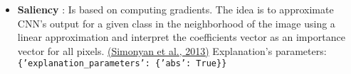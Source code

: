 \documentclass{article}%
\begin{document}
\begin{itemize}
{                                  'selected\_layer': 'features.denseblock4.denselayer16.conv2'\}\} \newline%
%
}%
\item%
\textbf{Saliency}%
:  Is based on computing gradients. The idea is to approximate CNN's output for a given class in the neighborhood of the image using a linear approximation and interpret the coefficients vector as an importance vector for all pixels.%
\href{https://arxiv.org/abs/1312.6034}{(Simonyan et al., 2013)}%
\newline%
%
Explanation's parameters: \newline%
%
\texttt{%
\{'explanation\_parameters': \{'abs': True\}\} \newline%
%
}%
\end{itemize}

%
\newpage%
\end{document}
